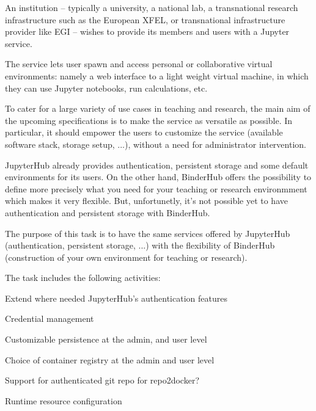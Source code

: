 \begin{task}[
  title=JupyterHub / BinderHub convergence,
  id=jh-bh-conv,
  lead=EP,
  PM=15, %
  wphases={0-48},
  partners={EP,WTT}]

  An institution – typically a university, a national lab, a transnational
  research infrastructure such as the European XFEL, or transnational 
  infrastructure provider like EGI – wishes to provide its members and 
  users with a Jupyter service.

  The service lets user spawn and access personal or collaborative virtual
  environments: namely a web interface to a light weight virtual machine,
  in which they can use Jupyter notebooks, run calculations, etc.

  To cater for a large variety of use cases in teaching and research,
  the main aim of the upcoming specifications is to make the service as
  versatile as possible. In particular, it should empower the users to 
  customize the service (available software stack, storage setup, ...),
  without a need for administrator intervention.

  JupyterHub already provides authentication, persistent storage and some
  default environments for its users. On the other hand, BinderHub offers
  the possibility to define more precisely what you need for your teaching
  or research environmment which makes it very flexible. But, unfortunetly,
  it's not possible yet to have authentication and persistent storage with
  BinderHub.

  The purpose of this task is to have the same services offered by JupyterHub
  (authentication, persistent storage, ...) with the flexibility of BinderHub
  (construction of your own environment for teaching or research).

  The task includes the following activities:
  \begin{compactitem}
  \item Extend where needed JupyterHub's authentication features%
  \item Credential management
  \item Customizable persistence at the admin, and user level
  \item Choice of container registry at the admin and user level %
  \item Support for authenticated git repo for repo2docker? %
  \item Runtime resource configuration %
  \end{compactitem}

\end{task}
